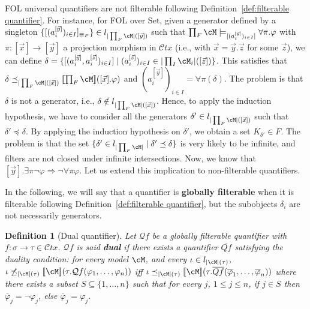 \documentclass[preprint,3p,times]{elsarticle}
\newtheorem{definition}{Definition}[section]
\newcommand{\Set}{\mathrm{Set}}
\def\sem#1{[\![ #1 ] \!]}
\newcommand{\Ctx}{\mathcal{C}tx}
\newcommand{\Qf}{\mathcal{Q}f}
\begin{document}
FOL universal quantifiers are not filterable following Definition~\ref{def:filterable quantifier}. For instance,  for FOL over $\Set$, given a generator defined by a singleton $\{[(a^{[\vec{y}]}_i)_{i \in I}]_{\equiv_F}\} \in l_{|\prod_F \cM|([\vec{y}])}$ such that\footnotemark{} $\prod_F \cM \models_{[(a^{[\vec{y}]}_i)_{i \in I}]} \forall \pi.\varphi$ with $\pi : [\vec{x}] \to [\vec{y}]$ a projection morphism in $\Ctx$ (i.e., with \(\vec{x} = \vec{y}.\vec{z}\) for some \(\vec{z}\)), we can define $\delta = \{[(a^{[\vec{y}]}_i,a^{[\vec{z}]}_i)_{i \in I}] \mid (a^{[\vec{z}]}_i)_{i \in I} \in |\prod_I \cM_i|([\vec{z}])\}$. This satisfies that $\delta \preceq_{|\prod_F \cM|([\vec{x}])} \sem{\prod_F \cM}([\vec{x}].\varphi)$ and $(a^{[\vec{y}]}_i)_{i \in I} = \forall \pi (\delta)$. The problem is that $\delta$ is not a generator, i.e., $\delta \notin l_{|\prod_F \cM|([\vec{x}])}$. Hence, to apply the induction hypothesis, we have to consider all the generators $\delta' \in l_{|\prod_F \cM|([\vec{x}])}$ such that $\delta' \preceq \delta$. By applying the induction hypothesis on $\delta'$, we obtain a set $K_{\delta'} \in F$. The problem is that the set $\{\delta' \in l_{|\prod_F \cM|} \mid \delta' \preceq \delta\}$ is very likely to be infinite, and filters are not closed under infinite intersections. Now, we know that $[\vec{y}].\exists \pi \neg \varphi \Rightarrow \neg \forall \pi \varphi$. Let us extend this implication to non-filterable quantifiers.


\medskip
In the following, we will say that a quantifier is {\bf globally filterable}  when it is filterable following Definition~\ref{def:filterable quantifier}, but the subobjects $\delta_i$ are not necessarily generators.  

\begin{definition}[Dual quantifier]
\label{def:dual quantifier}
Let $\Qf$ be a globally filterable quantifier with $f : \sigma \to \tau \in \Ctx$. $\Qf$ is said {\bf dual} if there exists a quantifier $\overline{Qf}$ satisfying the duality condition: for every model $\cM$, and every $\iota \in l_{|\cM|(\tau)}$, $\iota \not\preceq_{|\cM|(\tau)} \sem{\cM}(\tau.\Qf(\varphi_1,\ldots,\varphi_n))$ iff $\iota \preceq_{|\cM|(\tau)} \sem{\cM}(\tau.\overline{Qf}(\overline{\varphi}_1,\ldots,\overline{\varphi}_n))$  where there exists a subset $S \subseteq \{1,\ldots,n\}$ such that for every $j$, $1 \leq j \leq n$, if $j \in S$ then $\overline{\varphi}_j = \neg \varphi_j$, else $\overline{\varphi}_j = \varphi_j$.  
\end{definition}
\end{document}
